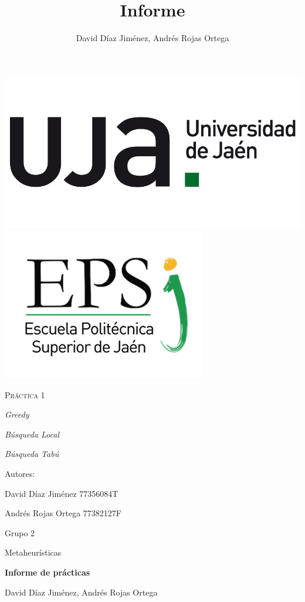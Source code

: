 \documentclass{article}
\title{Informe}
\author{David Díaz Jiménez, Andrés Rojas Ortega}
\begin{document}
	
	\begin{titlepage}
		\centering
		{\includegraphics[scale=0.2]{img/np_UJA_generica_6.png}
		\includegraphics[scale=0.35]{img/Logo_EPS.png}}
		\vspace{1cm}
		{\scshape\Huge Práctica 1 \par}
		\vspace{3cm}
		{\itshape\Large Greedy \par}
		{\itshape\Large Búsqueda Local \par}
		{\itshape\Large Búsqueda Tabú \par}
		\vfill
		{\Large Autores: \par}
		{\Large David Díaz Jiménez 77356084T \par}
		{\Large Andrés Rojas Ortega 77382127F\par}
		\vfill
		{\Large Grupo 2 \par}
	\end{titlepage}
	
	\begin{center}
		
		\begin{large}
			
			Metaheurísticas
			
		\end{large}
		
		\vspace*{0.2in}
		\textbf{\large Informe de prácticas}
		
		\vspace*{.2in}
		
		David Díaz Jiménez, Andrés Rojas Ortega
		
		\vspace*{2.5cm}
		
	\end{center}
\end{document}
